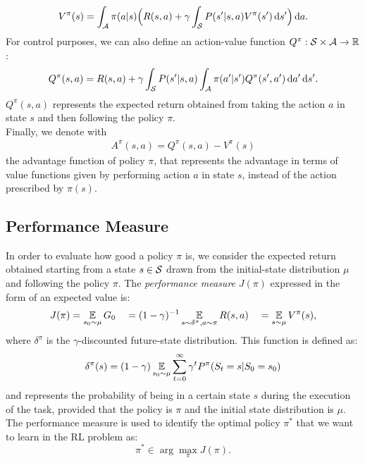 \begin{align} V^{\pi}(s) = \int_{\mathcal{A}} \pi(a|s) \Big(R(s,a) + \gamma \int_{\mathcal{S}}P(s'|s,a)V^{\pi}(s')\,\mathrm{d} s' \Big) \,\mathrm{d} a.\end{align}
For control purposes, we can also define an action-value function $Q^{\pi}: \mathcal{S} \times \mathcal{A} \rightarrow \mathbb{R}$: \begin{align} Q^{\pi}(s,a) = R(s,a) + \gamma \int_{\mathcal{S}} P(s'|s,a) \int_{\mathcal{A}} \pi(a'|s') Q^{\pi}(s',a') \,\mathrm{d} a' \,\mathrm{d} s'.\end{align}
$Q^{\pi}(s,a)$ represents the expected return obtained from taking the action $a$ in state $s$ and then following the policy $\pi$. \\
\newline
Finally, we denote with
\begin{align} A^{\pi}(s,a) = Q^{\pi}(s,a) - V^{\pi}(s) \end{align}
the advantage function of policy $\pi$, that represents the advantage in terms of value functions given by performing action $a$ in state $s$, instead of the action prescribed by $\pi(s)$.

\subsection{Performance Measure}
In order to evaluate how good a policy $\pi$ is, we consider the expected return obtained starting from a state $s \in \mathcal{S}$ drawn from the initial-state distribution $\mu$ and following the policy $\pi$. The \emph{performance measure} $J(\pi)$ expressed in the form of an expected value is:
\begin{align} {J(\pi) = \operatorname*{\mathbb{E}}_{s_0\sim\mu}{G_0} \quad = (1 - \gamma)^{-1}\operatorname*{\mathbb{E}}_{s\sim\delta^{\pi}, a \sim \pi}R(s,a)} \quad = \operatorname*{\mathbb{E}}_{s\sim\mu}V^{\pi}(s), \end{align}
where $\delta^{\pi}$ is the $\gamma$-discounted future-state distribution. This function is defined as:
\begin{align} \delta^{\pi}(s) = (1 - \gamma)\operatorname*{\mathbb{E}}_{s_{0}\sim\mu}\sum_{t=0}^{\infty}\gamma^t P^{\pi}(S_t = s|S_0=s_0) \end{align}
and represents the probability of being in a certain state $s$ during the execution of the task, provided that the policy is $\pi$ and the initial state distribution is $\mu$.\\
\newline
The performance measure is used to identify the optimal policy $\pi^{*}$ that we want to learn in the \ac{RL} problem as:
$$ \pi^{*} \in \arg \max_{\pi} J(\pi).$$

